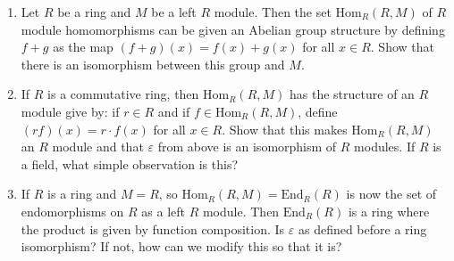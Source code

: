 \documentclass[crop=false,class=article]{standalone}                           %
\begin{document}
        \begin{problem}
            \par\hfill\par
            \begin{enumerate}
                \item   Let $R$ be a ring and $M$ be a left $R$ module.
                        Then the set $\textrm{Hom}_{R}(R,M)$ of $R$ module
                        homomorphisms can be given an Abelian group
                        structure by defining $f+g$ as the map
                        $(f+g)(x)=f(x)+g(x)$ for all $x\in{R}$. Show that
                        there is an isomorphism between this group and $M$.
                \item   If $R$ is a commutative ring, then
                        $\textrm{Hom}_{R}(R,M)$ has the structure of an
                        $R$ module give by: if $r\in{R}$ and if
                        $f\in\textrm{Hom}_{R}(R,M)$, define
                        $(rf)(x)=r\cdot{f(x)}$ for all $x\in{R}$. Show that
                        this makes $\textrm{Hom}_{R}(R,M)$ an $R$ module
                        and that $\varepsilon$ from above is an isomorphism
                        of $R$ modules. If $R$ is a field, what simple
                        observation is this?
                \item   If $R$ is a ring and $M=R$, so
                        $\textrm{Hom}_{R}(R,M)=\textrm{End}_{R}(R)$ is
                        now the set of endomorphisms on $R$ as a left
                        $R$ module. Then $\textrm{End}_{R}(R)$ is a ring
                        where the product is given by function
                        composition. Is $\varepsilon$ as defined before
                        a ring isomorphism? If not, how can we modify this
                        so that it is?
            \end{enumerate}
        \end{problem}
\end{document}
